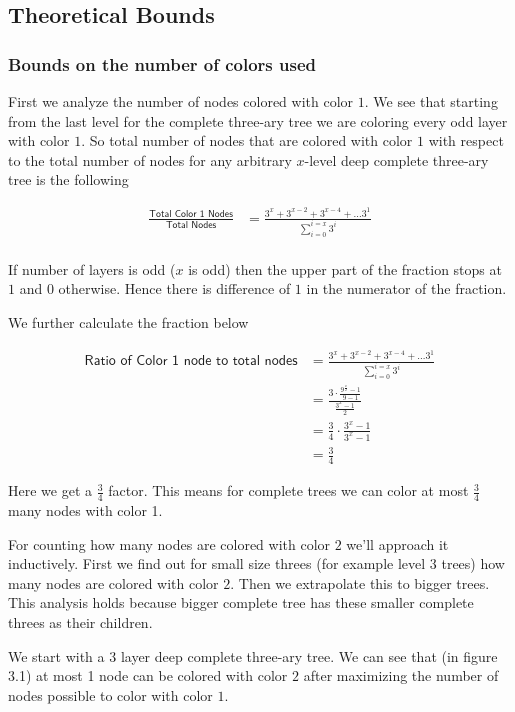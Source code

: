 \documentclass{article}
\theoremstyle{remark}
\begin{document}
\subsection{Theoretical Bounds}
\subsubsection{Bounds on the number of colors used}
First we analyze the number of nodes colored with color $1$. We see that starting from the last level for the complete three-ary tree we are coloring every odd layer with color $1$. So total number of nodes that are colored with color $1$ with respect to the total number of nodes for any arbitrary $x$-level deep complete three-ary tree is the following

\begin{align*}
    \frac{\textsf{Total Color 1 Nodes}}{\textsf{Total Nodes}} &= \frac{3^{x} + 3^{x - 2} + 3^{x-4} + \dots 3^{1}}{\displaystyle\sum_{i = 0} ^{i = x} 3^i}\\
\end{align*}

If number of layers is odd ($x$ is odd) then the upper part of the fraction stops at $1$ and $0$ otherwise. Hence there is difference of $1$ in the numerator of the fraction.

We further calculate the fraction below

\begin{align*}
    \textsf{Ratio of Color 1 node to total nodes} &= \frac{3^{x} + 3^{x - 2} + 3^{x-4} + \dots 3^{1}}{\displaystyle\sum_{i = 0} ^{i = x} 3^i}\\
    &= \frac{3 \cdot \frac{9^{\frac{x}{2}} - 1}{9 - 1}}{\frac{3^x - 1}{2}}\\
    &= \frac{3}{4} \cdot \frac{3^x - 1}{3^x - 1}\\
    &= \frac{3}{4}
\end{align*}

Here we get a $\frac{3}{4}$ factor. This means for complete trees we can color at most $\frac{3}{4}$ many nodes with color 1.

For counting how many nodes are colored with color $2$ we'll approach it inductively. First we find out for small size threes (for example level $3$ trees) how many nodes are colored with color $2$. Then we extrapolate this to bigger trees. This analysis holds because bigger complete tree has these smaller complete threes as their children.

We start with a $3$ layer deep complete three-ary tree. We can see that (in figure 3.1) at most 1 node can be colored with color $2$ after maximizing the number of nodes possible to color with color $1$.
\end{document}
